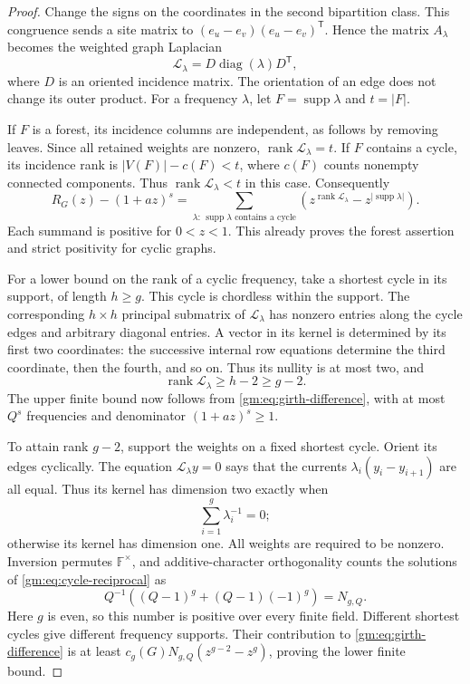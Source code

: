 \documentclass[11pt,a4paper]{article}
\numberwithin{equation}{section}
\theoremstyle{definition}
\theoremstyle{remark}
\newcommand{\F}{\mathbb F}
\newcommand{\1}{\mathbf 1}
\newcommand{\rank}{\operatorname{rank}}
\newcommand{\supp}{\operatorname{supp}}
\newcommand{\diag}{\operatorname{diag}}
\begin{document}
\begin{proof}
Change the signs on the coordinates in the second bipartition class.
This congruence sends a site matrix to
$(e_u-e_v)(e_u-e_v)^{\mathsf T}$. Hence the matrix $A_\lambda$ becomes the
weighted graph Laplacian
\[
 \mathcal L_\lambda=D\diag(\lambda)D^{\mathsf T},
\]
where $D$ is an oriented incidence matrix. The orientation of an edge
does not change its outer product. For a frequency $\lambda$, let
$F=\supp\lambda$ and $t=|F|$.

If $F$ is a forest, its incidence columns are independent, as follows by
removing leaves. Since all retained weights are nonzero,
$\rank\mathcal L_\lambda=t$. If $F$ contains a cycle, its incidence rank
is $|V(F)|-c(F)<t$, where $c(F)$ counts nonempty connected components.
Thus $\rank\mathcal L_\lambda<t$ in this case. Consequently
\begin{equation}\label{gm:eq:girth-difference}
 R_G(z)-(1+az)^s
  =\sum_{\lambda:\,\supp\lambda\text{ contains a cycle}}
      \left(z^{\rank\mathcal L_\lambda}-z^{|\supp\lambda|}\right).
\end{equation}
Each summand is positive for $0<z<1$. This already proves the forest
assertion and strict positivity for cyclic graphs.

For a lower bound on the rank of a cyclic frequency, take a shortest
cycle in its support, of length $h\geq g$. This cycle is chordless within
the support. The corresponding $h\times h$ principal submatrix of
$\mathcal L_\lambda$ has nonzero entries along the cycle edges and arbitrary
diagonal entries. A vector in its kernel is determined by its first two
coordinates: the successive internal row equations determine the third
coordinate, then the fourth, and so on. Thus its nullity is at most two,
and
\begin{equation}\label{gm:eq:girth-rank-bound}
 \rank\mathcal L_\lambda\geq h-2\geq g-2.
\end{equation}
The upper finite bound now follows from \eqref{gm:eq:girth-difference},
with at most $Q^s$ frequencies and denominator $(1+az)^s\geq1$.

To attain rank $g-2$, support the weights on a fixed shortest cycle.
Orient its edges cyclically. The equation $\mathcal L_\lambda y=0$ says
that the currents $\lambda_i(y_i-y_{i+1})$ are all equal. Thus its kernel
has dimension two exactly when
\begin{equation}\label{gm:eq:cycle-reciprocal}
 \sum_{i=1}^{g}\lambda_i^{-1}=0;
\end{equation}
otherwise its kernel has dimension one. All weights are required to be
nonzero. Inversion permutes $\F^\times$, and additive-character
orthogonality counts the solutions of \eqref{gm:eq:cycle-reciprocal} as
\[
 Q^{-1}\left((Q-1)^g+(Q-1)(-1)^g\right)=N_{g,Q}.
\]
Here $g$ is even, so this number is positive over every finite field.
Different shortest cycles give different frequency supports. Their
contribution to \eqref{gm:eq:girth-difference} is at least
$c_g(G)N_{g,Q}(z^{g-2}-z^g)$, proving the lower finite bound.


\end{proof}
\end{document}
